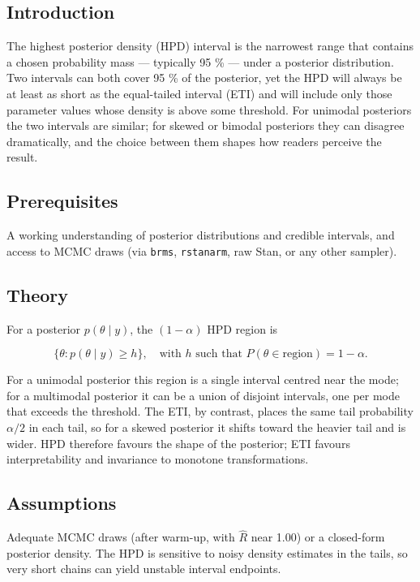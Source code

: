 \documentclass[
]{article}
\author{}
\date{\vspace{-2.5em}}
\begin{document}
\subsection{Introduction}\label{introduction}

The highest posterior density (HPD) interval is the narrowest range that
contains a chosen probability mass --- typically 95 \% --- under a
posterior distribution. Two intervals can both cover 95 \% of the
posterior, yet the HPD will always be at least as short as the
equal-tailed interval (ETI) and will include only those parameter values
whose density is above some threshold. For unimodal posteriors the two
intervals are similar; for skewed or bimodal posteriors they can
disagree dramatically, and the choice between them shapes how readers
perceive the result.

\subsection{Prerequisites}\label{prerequisites}

A working understanding of posterior distributions and credible
intervals, and access to MCMC draws (via \texttt{brms},
\texttt{rstanarm}, raw Stan, or any other sampler).

\subsection{Theory}\label{theory}

For a posterior \(p(\theta \mid y)\), the \((1-\alpha)\) HPD region is

\[\{\theta : p(\theta \mid y) \ge h\}, \quad \text{with } h \text{ such that } P(\theta \in \text{region}) = 1 - \alpha.\]

For a unimodal posterior this region is a single interval centred near
the mode; for a multimodal posterior it can be a union of disjoint
intervals, one per mode that exceeds the threshold. The ETI, by
contrast, places the same tail probability \(\alpha/2\) in each tail, so
for a skewed posterior it shifts toward the heavier tail and is wider.
HPD therefore favours the shape of the posterior; ETI favours
interpretability and invariance to monotone transformations.

\subsection{Assumptions}\label{assumptions}

Adequate MCMC draws (after warm-up, with \(\hat R\) near 1.00) or a
closed-form posterior density. The HPD is sensitive to noisy density
estimates in the tails, so very short chains can yield unstable interval
endpoints.
\end{document}
